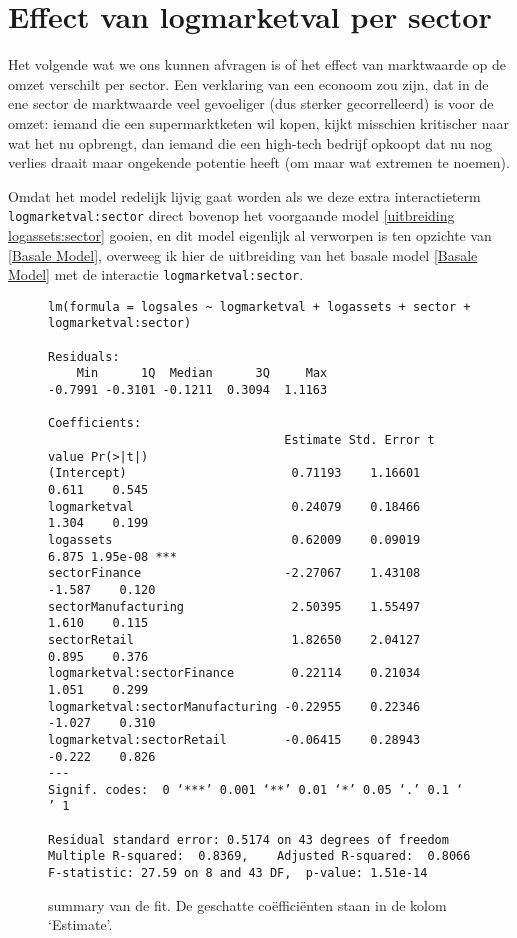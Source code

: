 \documentclass[a4paper]{report}
\begin{document}
\section{Effect van logmarketval per sector}
\label{uitbreiding logmarketval:sector}
  Het volgende wat we ons kunnen afvragen is of het effect van marktwaarde op de omzet verschilt per sector. Een verklaring van een econoom zou zijn, dat in de ene sector de marktwaarde veel gevoeliger (dus sterker gecorrelleerd) is voor de omzet: iemand die een supermarktketen wil kopen, kijkt misschien kritischer naar wat het nu opbrengt, dan iemand die een high-tech bedrijf opkoopt dat nu nog verlies draait maar ongekende potentie heeft (om maar wat extremen te noemen).
  
  Omdat het model redelijk lijvig gaat worden als we deze extra interactieterm \verb!logmarketval:sector! direct bovenop het voorgaande model \ref{uitbreiding logassets:sector} gooien, en dit model eigenlijk al verworpen is ten opzichte van \ref{Basale Model}, overweeg ik hier de uitbreiding van het basale model \ref{Basale Model} met de interactie \verb!logmarketval:sector!.
  
  \begin{figure}[H]
  \begin{verbatim}
lm(formula = logsales ~ logmarketval + logassets + sector + logmarketval:sector)

Residuals:
    Min      1Q  Median      3Q     Max 
-0.7991 -0.3101 -0.1211  0.3094  1.1163 

Coefficients:
                                 Estimate Std. Error t value Pr(>|t|)    
(Intercept)                       0.71193    1.16601   0.611    0.545    
logmarketval                      0.24079    0.18466   1.304    0.199    
logassets                         0.62009    0.09019   6.875 1.95e-08 ***
sectorFinance                    -2.27067    1.43108  -1.587    0.120    
sectorManufacturing               2.50395    1.55497   1.610    0.115    
sectorRetail                      1.82650    2.04127   0.895    0.376    
logmarketval:sectorFinance        0.22114    0.21034   1.051    0.299    
logmarketval:sectorManufacturing -0.22955    0.22346  -1.027    0.310    
logmarketval:sectorRetail        -0.06415    0.28943  -0.222    0.826    
---
Signif. codes:  0 ‘***’ 0.001 ‘**’ 0.01 ‘*’ 0.05 ‘.’ 0.1 ‘ ’ 1

Residual standard error: 0.5174 on 43 degrees of freedom
Multiple R-squared:  0.8369,	Adjusted R-squared:  0.8066 
F-statistic: 27.59 on 8 and 43 DF,  p-value: 1.51e-14
  \end{verbatim}
  \caption{summary van de fit. De geschatte co\"effici\"enten staan in de kolom `Estimate'.}
  \end{figure}
  
\end{document}
